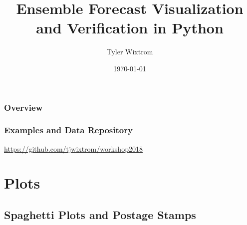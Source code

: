 \documentclass{beamer}
\title[Ensemble Visualization]{Ensemble Forecast Visualization and Verification in Python} %
\author{Tyler Wixtrom} %
\institute[TTU/ATMO] %
{
Atmospheric Sciences Group, Texas Tech University \\ %
\medskip
\textit{tyler.wixtrom@ttu.edu} %
}
\date{\today} %
\begin{document}
\begin{frame}
\titlepage %
\end{frame}

\begin{frame}
\frametitle{Overview} %
\tableofcontents %
\end{frame}

\begin{frame}
  \frametitle{Examples and Data Repository}
  \url{https://github.com/tjwixtrom/workshop2018}
\end{frame}

\section{Plots} %

\subsection{Spaghetti Plots and Postage Stamps} %
\end{document}
